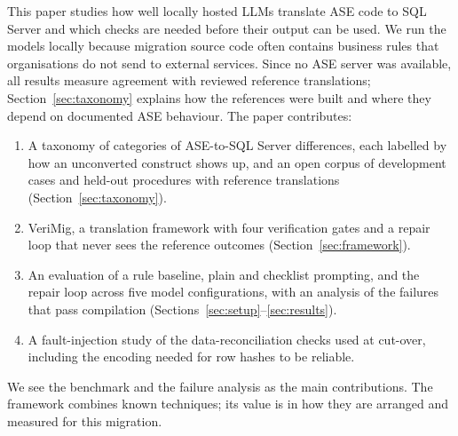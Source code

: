 This paper studies how well locally hosted LLMs translate ASE code to SQL Server and which checks are
needed before their output can be used. We run the models locally because migration source code often
contains business rules that organisations do not send to external services. Since no ASE server was
available, all results measure agreement with reviewed reference translations; Section~\ref{sec:taxonomy}
explains how the references were built and where they depend on documented ASE behaviour. The paper
contributes:
\begin{enumerate}
\item A taxonomy of \NumCategories{} categories of ASE-to-SQL Server differences, each labelled by how an
unconverted construct shows up, and an open corpus of \NumDevCases{} development cases and \NumHeldout{}
held-out procedures with reference translations (Section~\ref{sec:taxonomy}).
\item VeriMig, a translation framework with four verification gates and a repair loop that never sees the
reference outcomes (Section~\ref{sec:framework}).
\item An evaluation of a rule baseline, plain and checklist prompting, and the repair loop across five
model configurations, with an analysis of the failures that pass compilation
(Sections~\ref{sec:setup}--\ref{sec:results}).
\item A fault-injection study of the data-reconciliation checks used at cut-over, including the encoding
needed for row hashes to be reliable.
\end{enumerate}
We see the benchmark and the failure analysis as the main contributions. The framework combines known
techniques; its value is in how they are arranged and measured for this migration.
